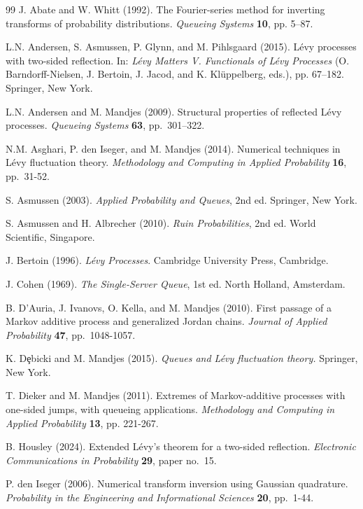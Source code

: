\documentclass[reqno,12pt]{amsart}
\begin{document}
{{\begin{thebibliography}{99}
{\sc J. Abate} and {\sc W. Whitt} (1992). 
The Fourier-series method for inverting transforms of probability distributions. {\it Queueing Systems} {\bf 10}, pp. 5–87.

{\sc  L.N. Andersen, S. Asmussen, P.  Glynn,} and {\sc M.  Pihlsgaard} (2015). 
L\'evy processes with two-sided reflection. In: {\it L\'evy Matters V. Functionals of L\'evy Processes} (O. Barndorff-Nielsen, J. Bertoin, J. Jacod, and K. Kl\"uppelberg, eds.), pp. 67–182. Springer, New York.

{\sc L.N. Andersen} and {\sc M. Mandjes} (2009). 
Structural properties of reflected L\'evy processes. {\it Queueing Systems} {\bf  63}, pp.\ 301–322. 

{\sc N.M. Asghari, P. den Iseger,} and {\sc M. Mandjes} (2014). Numerical techniques in Lévy fluctuation theory. {\it Methodology and Computing in Applied Probability} {\bf 16}, pp.\ 31-52.

{\sc S. Asmussen} (2003).
{\em Applied Probability and Queues}, 2nd ed.
Springer, New York.

{\sc S. Asmussen} and {\sc H. Albrecher} (2010).
{\em Ruin Probabilities}, 2nd ed.
World Scientific, Singapore.



{\sc J. Bertoin} (1996).
{\it L\'evy Processes}. Cambridge University Press, Cambridge. 


{\sc J. Cohen} (1969). {\it The Single-Server Queue}, 1st ed. North Holland, Amsterdam. 


{\sc B. D'Auria, J. Ivanovs, O. Kella}, and {\sc M. Mandjes} (2010).
First passage of a Markov additive process and generalized Jordan chains.
{\it Journal of Applied Probability} {\bf 47}, pp.\ 1048-1057.

{\sc K. D\c{e}bicki} and {\sc M. Mandjes} (2015).
{\it Queues and L\'evy fluctuation theory.} Springer, New York. 

{\sc T. Dieker} and {\sc M. Mandjes} (2011). 
Extremes of Markov-additive processes with one-sided jumps, with queueing applications. {\it
Methodology and Computing in Applied Probability} {\bf  13}, pp. 221-267.

{\sc B. Housley} (2024). 
Extended L\'evy’s theorem for a two-sided reflection.
{\it Electronic Communications in Probability} {\bf 29}, paper no.\ 15. 

{\sc P. den Iseger} (2006). 
Numerical transform inversion using Gaussian quadrature.
{\it Probability in the Engineering and  Informational Sciences} {\bf 20}, pp.\ 1-44.


\end{thebibliography}}}
\end{document}
